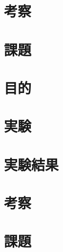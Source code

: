 \documentclass[uplatex, 11pt,a4j, titlepage]{jsarticle}
\begin{document}
\section{考察}
\section{課題}


\newpage
\resetcounters



\subtitle{2019/*/*}

\section{目的}
\section{実験}
\section{実験結果}
\section{考察}
\section{課題}


\newpage
\thispagestyle{empty}
\nocite{key1}
\nocite{key2}


\end{document}
